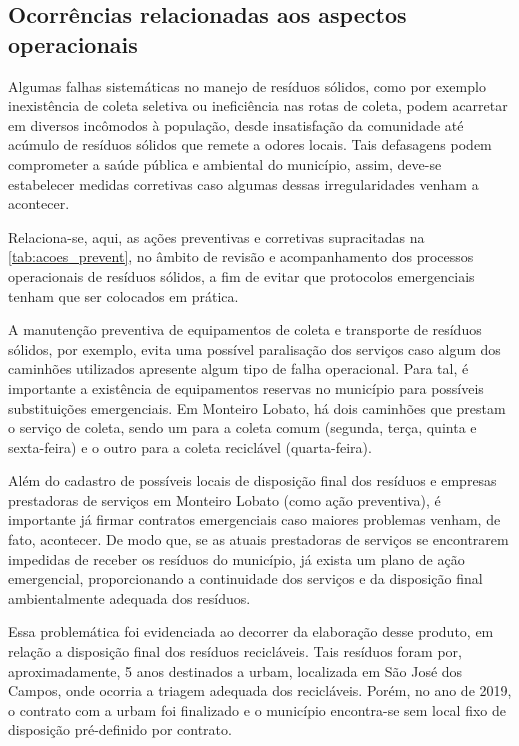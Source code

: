 \subsection{Ocorrências relacionadas aos aspectos operacionais}
Algumas falhas sistemáticas no manejo de resíduos sólidos, como por exemplo inexistência de coleta seletiva ou ineficiência nas rotas de coleta, podem acarretar em diversos incômodos à população, desde insatisfação da comunidade até acúmulo de resíduos sólidos que remete a odores locais. Tais defasagens podem comprometer a saúde pública e ambiental do município, assim, deve-se estabelecer medidas corretivas caso algumas dessas irregularidades venham a acontecer. 

Relaciona-se, aqui, as ações preventivas e corretivas supracitadas na \autoref{tab:acoes_prevent}, no âmbito de revisão e acompanhamento dos processos operacionais de resíduos sólidos, a fim de evitar que protocolos emergenciais tenham que ser colocados em prática. 

A manutenção preventiva de equipamentos de coleta e transporte de resíduos sólidos, por exemplo, evita uma possível paralisação dos serviços caso algum dos caminhões utilizados apresente algum tipo de falha operacional. Para tal, é importante a existência de equipamentos reservas no município para possíveis substituições emergenciais. Em Monteiro Lobato, há dois caminhões que prestam o serviço de coleta, sendo um para a coleta comum (segunda, terça, quinta e sexta-feira) e o outro para a coleta reciclável (quarta-feira).

Além do cadastro de possíveis locais de disposição final dos resíduos e empresas prestadoras de serviços em Monteiro Lobato (como ação preventiva), é importante já firmar contratos emergenciais caso maiores problemas venham, de fato, acontecer. De modo que, se as atuais prestadoras de serviços se encontrarem impedidas de receber os resíduos do município, já exista um plano de ação emergencial, proporcionando a continuidade dos serviços e da disposição final ambientalmente adequada dos resíduos.

Essa problemática foi evidenciada ao decorrer da elaboração desse produto, em relação a disposição final dos resíduos recicláveis. Tais resíduos foram por, aproximadamente, 5 anos destinados a \gls{urbam}, localizada em São José dos Campos, onde ocorria a triagem adequada dos recicláveis. Porém, no ano de 2019, o contrato com a \gls{urbam} foi finalizado e o município encontra-se sem local fixo de disposição pré-definido por contrato.


